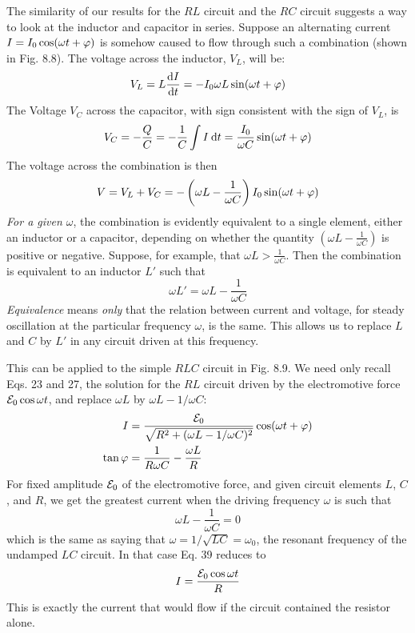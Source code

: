 The similarity of our results for the $RL$ circuit and the $RC$ circuit
suggests a way to look at the inductor and capacitor in series.
Suppose an alternating current $I = I_0 \cos (\omega t + \varphi)$ is somehow
caused to flow through such a combination (shown in Fig. 8.8). The
voltage across the inductor, $V_L$, will be:
\begin{equation}
  V_L = L\frac{\textup{d} I}{\textup{d} t} = -I_0\omega L\sin(\omega t+\varphi)
\end{equation}
The Voltage $V_C$ across the capacitor, with sign consistent with the sign
of $V_L$, is
\begin{equation}
  V_C = -\frac{Q}{C} = -\frac{1}{C}\int I\:\textup{d} t = \frac{I_0}{\omega C}\sin(\omega t+\varphi)
\end{equation}
The voltage across the combination is then
\begin{equation}
  V = V_L+V_C = -\left(\omega L-\frac{1}{\omega C}\right)I_0\sin(\omega t+\varphi)
\end{equation}
\emph{For a given $\omega$}, the combination is evidently equivalent to a single 
element, either an inductor or a capacitor, depending on whether the
quantity $\left(\omega L-\frac{1}{\omega C}\right)$ is positive or negative. Suppose, for example,
that $\omega L>\frac{1}{\omega C}$.  Then the combination is equivalent to an inductor
$L'$ such that
\begin{equation}
  \omega L' = \omega L-\frac{1}{\omega C}
\end{equation}
\emph{Equivalence} means \emph{only} that the relation between current and
voltage, for steady oscillation at the particular frequency $\omega$, is the
same. This allows us to replace $L$ and $C$ by $L'$ in any circuit driven
at this frequency.

This can be applied to the simple $RLC$ circuit in Fig. 8.9. We need
only recall Eqs. 23 and 27, the solution for the $RL$ circuit driven by
the electromotive force $\mathcal{E}_0 \cos \omega t$, and replace $\omega L$ by $\omega L - 1/\omega C$:
\begin{align}
  I &= \frac{\mathcal{E}_0}{\sqrt{R^2+(\omega L - 1/\omega C)^2}}\cos(\omega t+\varphi) \\
  \tan\varphi &= \frac{1}{R\omega C}-\frac{\omega L}{R}
\end{align}
For fixed amplitude $\mathcal{E}_0$ of the electromotive force, and given circuit
elements $L$, $C$, and $R$, we get the greatest current when the driving
frequency $\omega$ is such that
\begin{equation}
  \omega L - \frac{1}{\omega C} = 0
\end{equation}
which is the same as saying that $\omega = 1/\sqrt{LC}=\omega_0$, the resonant
frequency of the undamped $LC$ circuit. In that case Eq. 39 reduces to
\begin{equation}
  I =  \frac{\mathcal{E}_0\cos\omega t}{R}
\end{equation}
This is exactly the current that would flow if the circuit contained
the resistor alone.


